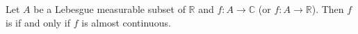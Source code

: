 \documentclass[12pt]{article}
\begin{document}
Let $A$ be a Lebesgue measurable subset of $\mathbb{R}$ and $f:A \to \mathbb{C}$ (or $f:A \to \mathbb{R}$). Then $f$ is  if and only if $f$ is almost continuous.
\end{document}
